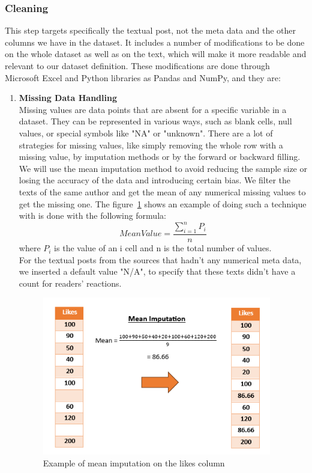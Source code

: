\subsubsection{Cleaning}
This step targets specifically the textual post, not the meta data and the other columns we have in the dataset. It includes a number of modifications to be done on the whole dataset as well as on the text, which will make it more readable and relevant to our dataset definition. These modifications are done through Microsoft Excel and Python libraries as Pandas and NumPy, and they are:
\begin{enumerate}
\item \textbf{Missing Data Handling}\\
Missing values are data points that are absent for a specific variable in a dataset. They can be represented in various ways, such as blank cells, null values, or special symbols like "NA" or "unknown". There are a lot of strategies for missing values, like simply removing the whole row with a missing value, by imputation methods or by the forward or backward filling. We will use the mean imputation method to avoid reducing the sample size or losing the accuracy of the data and introducing certain bias. We filter the texts of the same author and get the mean of any numerical missing values to get the missing one. The figure~\ref{fig:meanImputation} shows an example of doing such a technique with is done with the following formula: 
\[ Mean Value = \frac{\sum_{i=1}^n P_i}{n} \]
where \( P_i \) is the value of an i cell and n is the total number of values.\\
For the textual posts from the sources that hadn't any numerical meta data, we inserted a default value "N/A", to specify that these texts didn't have a count for readers' reactions.
\begin{figure}[H]
\centering
\includegraphics[width=10cm]{meanImputation}
\caption{Example of mean imputation on the likes column}
\label{fig:meanImputation}
\end{figure}


\end{enumerate}
